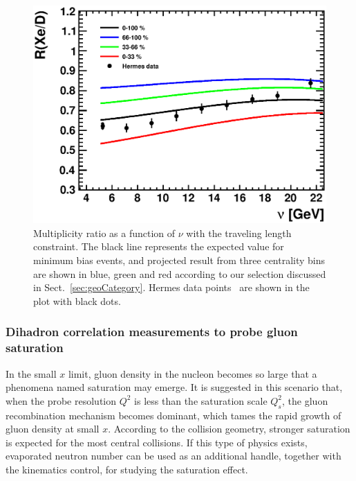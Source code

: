 \begin{figure}
\begin{center}
\includegraphics[width=0.7\columnwidth,keepaspectratio]{plots/chpt7/energyloss_Hermes_nu_qHat_0.85_tau_9.eps}
\caption[Energy loss measurement with centrality bin]{Multiplicity ratio as a function of $\nu$ with the traveling length constraint. The black line represents the expected value for minimum bias events, and projected result from three centrality bins are shown in blue, green and red according to our selection discussed in Sect.~\ref{sec:geoCategory}. Hermes data points~\cite{Airapetian:2007vu} are shown in the plot with black dots.}
\label{fig:energyLoss}
\end{center}
\end{figure}



\subsubsection{Dihadron correlation measurements to probe gluon saturation}

In the small $x$ limit, gluon density in the nucleon becomes so large that a
phenomena named saturation may emerge. It is suggested in this scenario that, when the probe
resolution $Q^{2}$ is less than the saturation scale $Q^{2}_{s}$, the gluon
recombination mechanism becomes dominant, which tames the rapid growth of
gluon density at small $x$. According to the collision
geometry, stronger saturation is expected for the most central collisions. If
this type of physics exists, evaporated neutron number can be used as an
additional handle, together with the kinematics control, for studying the saturation effect.

